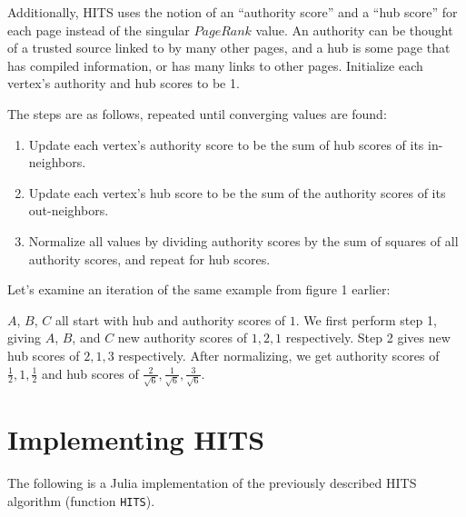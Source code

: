 \documentclass{article}
\begin{document}
Additionally, HITS uses the notion of an ``authority score'' and a ``hub score'' for each page instead of the singular $PageRank$ value. An authority can be thought of a trusted source linked to by many other pages, and a hub is some page that has compiled information, or has many links to other pages. Initialize each vertex's authority and hub scores to be 1.

The steps are as follows, repeated until converging values are found:

\begin{enumerate}
    \item Update each vertex's authority score to be the sum of hub scores of its in-neighbors.
    \item Update each vertex's hub score to be the sum of the authority scores of its out-neighbors.
    \item Normalize all values by dividing authority scores by the sum of squares of all authority scores, and repeat for hub scores.
\end{enumerate}

Let's examine an iteration of the same example from figure 1 earlier:
\begin{center}
\end{center}

$A$, $B$, $C$ all start with hub and authority scores of $1$. We first perform step 1, giving $A$, $B$, and $C$ new authority scores of $1, 2, 1$ respectively. Step 2 gives new hub scores of $2, 1, 3$ respectively. After normalizing, we get authority scores of $\frac{1}{2}, 1, \frac{1}{2}$ and hub scores of $\frac{2}{\sqrt{6}}, \frac{1}{\sqrt{6}}, \frac{3}{\sqrt{6}}$. 

\section{Implementing HITS}
The following is a Julia implementation of the previously described HITS algorithm (function \texttt{HITS}).
\end{document}
